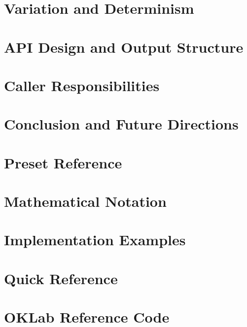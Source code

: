 \chapter{Variation and Determinism}


\chapter{API Design and Output Structure}


\chapter{Caller Responsibilities}


\chapter{Conclusion and Future Directions}


\newpage
\printbibliography[heading=bibintoc,title={References}]

\appendix

\chapter{Preset Reference}


\chapter{Mathematical Notation}


\chapter{Implementation Examples}


\chapter{Quick Reference}


\chapter{OKLab Reference Code}



